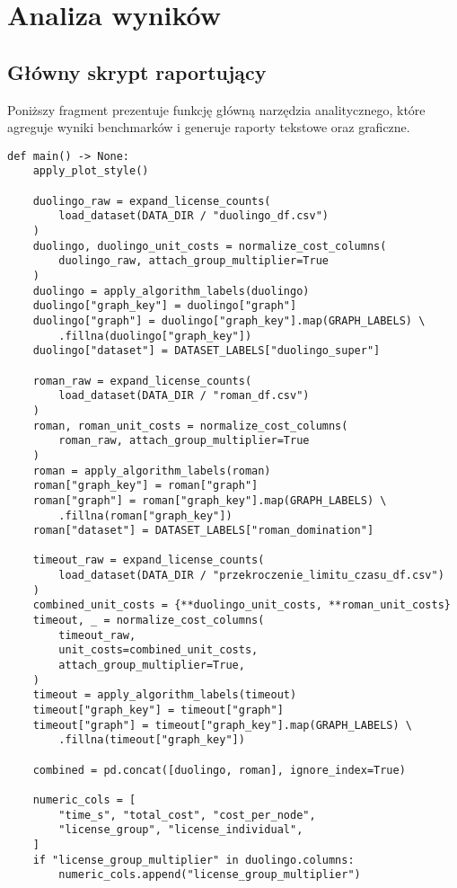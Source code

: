 \section{Analiza wyników}
\subsection{Główny skrypt raportujący}
Poniższy fragment prezentuje funkcję główną narzędzia analitycznego,
które agreguje wyniki benchmarków i generuje raporty tekstowe oraz
graficzne.

    {\footnotesize
        \begin{verbatim}
def main() -> None:
    apply_plot_style()

    duolingo_raw = expand_license_counts(
        load_dataset(DATA_DIR / "duolingo_df.csv")
    )
    duolingo, duolingo_unit_costs = normalize_cost_columns(
        duolingo_raw, attach_group_multiplier=True
    )
    duolingo = apply_algorithm_labels(duolingo)
    duolingo["graph_key"] = duolingo["graph"]
    duolingo["graph"] = duolingo["graph_key"].map(GRAPH_LABELS) \
        .fillna(duolingo["graph_key"])
    duolingo["dataset"] = DATASET_LABELS["duolingo_super"]

    roman_raw = expand_license_counts(
        load_dataset(DATA_DIR / "roman_df.csv")
    )
    roman, roman_unit_costs = normalize_cost_columns(
        roman_raw, attach_group_multiplier=True
    )
    roman = apply_algorithm_labels(roman)
    roman["graph_key"] = roman["graph"]
    roman["graph"] = roman["graph_key"].map(GRAPH_LABELS) \
        .fillna(roman["graph_key"])
    roman["dataset"] = DATASET_LABELS["roman_domination"]

    timeout_raw = expand_license_counts(
        load_dataset(DATA_DIR / "przekroczenie_limitu_czasu_df.csv")
    )
    combined_unit_costs = {**duolingo_unit_costs, **roman_unit_costs}
    timeout, _ = normalize_cost_columns(
        timeout_raw,
        unit_costs=combined_unit_costs,
        attach_group_multiplier=True,
    )
    timeout = apply_algorithm_labels(timeout)
    timeout["graph_key"] = timeout["graph"]
    timeout["graph"] = timeout["graph_key"].map(GRAPH_LABELS) \
        .fillna(timeout["graph_key"])

    combined = pd.concat([duolingo, roman], ignore_index=True)

    numeric_cols = [
        "time_s", "total_cost", "cost_per_node",
        "license_group", "license_individual",
    ]
    if "license_group_multiplier" in duolingo.columns:
        numeric_cols.append("license_group_multiplier")


\end{verbatim}}
